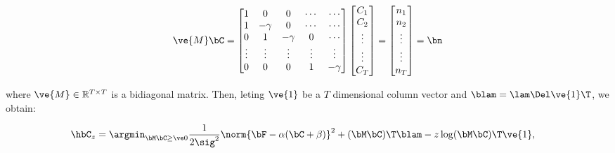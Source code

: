 \begin{align} \label{eq:M}
\ve{M} \bC = %
\begin{bmatrix}
1 & 0  & 0 & \cdots & \cdots \\
1 & -\gamma & 0 & \cdots & \cdots \\
0 & 1 & -\gamma & 0 & \cdots  \\
\vdots & \vdots & \vdots & \vdots & \vdots  \\
0 & 0 & 0 & 1 & -\gamma
\end{bmatrix}
\begin{bmatrix}
C_1 \\ C_2 \\ \vdots \\ \vdots \\ C_T  
\end{bmatrix}
= 
\begin{bmatrix}
n_1 \\ n_2 \\ \vdots \\ \vdots \\ n_T
\end{bmatrix}
= \bn
\end{align}

\noindent where $\ve{M} \in \mathbb{R}^{T \times T}$ is a bidiagonal matrix.  Then, leting $\ve{1}$ be a $T$ dimensional column vector and $\blam=\lam \Del \ve{1}\T$, we obtain: %
% 

\begin{align} 
\hbC_{\zzz} %
&= \az  \frac{1}{2 \sig^2} \norm{\bF - \alpha (\bC +\beta)}^2 + (\bM \bC )\T \blam  - \zzz \log(\bM \bC)\T\ve{1},  \label{eq:eta3}
\end{align}

